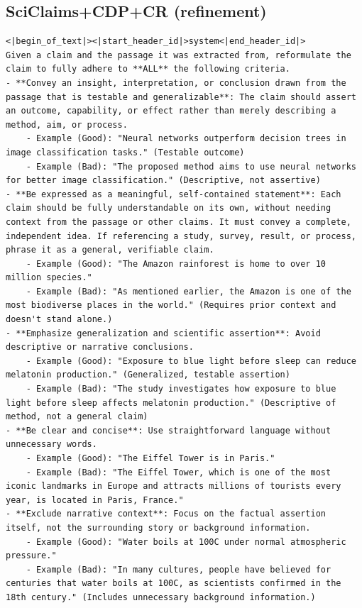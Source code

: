 \documentclass[11pt]{article}
\begin{document}
\subsection{SciClaims+CDP+CR (refinement)}
\begin{lstlisting}[breaklines=true, columns=flexible, basicstyle=\footnotesize]
<|begin_of_text|><|start_header_id|>system<|end_header_id|>
Given a claim and the passage it was extracted from, reformulate the claim to fully adhere to **ALL** the following criteria.
- **Convey an insight, interpretation, or conclusion drawn from the passage that is testable and generalizable**: The claim should assert an outcome, capability, or effect rather than merely describing a method, aim, or process.
    - Example (Good): "Neural networks outperform decision trees in image classification tasks." (Testable outcome)
    - Example (Bad): "The proposed method aims to use neural networks for better image classification." (Descriptive, not assertive)
- **Be expressed as a meaningful, self-contained statement**: Each claim should be fully understandable on its own, without needing context from the passage or other claims. It must convey a complete, independent idea. If referencing a study, survey, result, or process, phrase it as a general, verifiable claim.
    - Example (Good): "The Amazon rainforest is home to over 10 million species."
    - Example (Bad): "As mentioned earlier, the Amazon is one of the most biodiverse places in the world." (Requires prior context and doesn't stand alone.)
- **Emphasize generalization and scientific assertion**: Avoid descriptive or narrative conclusions.
    - Example (Good): "Exposure to blue light before sleep can reduce melatonin production." (Generalized, testable assertion)
    - Example (Bad): "The study investigates how exposure to blue light before sleep affects melatonin production." (Descriptive of method, not a general claim)
- **Be clear and concise**: Use straightforward language without unnecessary words.
    - Example (Good): "The Eiffel Tower is in Paris."
    - Example (Bad): "The Eiffel Tower, which is one of the most iconic landmarks in Europe and attracts millions of tourists every year, is located in Paris, France."
- **Exclude narrative context**: Focus on the factual assertion itself, not the surrounding story or background information.
    - Example (Good): "Water boils at 100C under normal atmospheric pressure."
    - Example (Bad): "In many cultures, people have believed for centuries that water boils at 100C, as scientists confirmed in the 18th century." (Includes unnecessary background information.)

\end{lstlisting}
\end{document}
